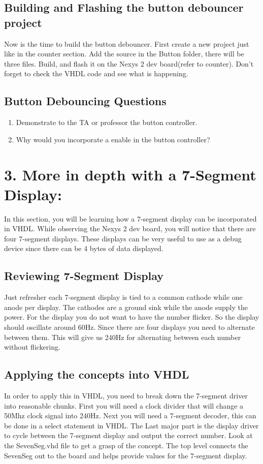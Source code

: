 \documentclass{article}
\begin{document}
\subsection{Building and Flashing the button debouncer project}
Now is the time to build the button debouncer. First create a new project just like in the counter section. Add the source in the Button folder, there will be three files. Build, and flash it on the Nexys 2 dev board(refer to counter). Don't forget to check the VHDL code and see what is happening.

\subsection{Button Debouncing Questions}

\begin{enumerate}
  \item Demonstrate to the TA or professor the button controller.
  \item Why would you incorporate a enable in the button controller?
\end{enumerate}

\newpage

\section{3. More in depth with a 7-Segment Display:}
In this section, you will be learning how a 7-segment display can be incorporated in VHDL. While observing the Nexys 2 dev board, you will notice that there are four 7-segment displays. These displays can be very useful to use as a debug device since there can be 4 bytes of data displayed.

\subsection{Reviewing 7-Segment Display}
Just refresher each 7-segment display is tied to a common cathode while one anode per display. The cathodes are a ground sink while the anode supply the power. For the display you do not want to have the number flicker. So the display should oscillate around 60Hz. Since there are four displays you need to alternate between them. This will give us 240Hz for alternating between each number without flickering.

\subsection{Applying the concepts into VHDL}
In order to apply this in VHDL, you need to break down the 7-segment driver into reasonable chunks. First you will need a clock divider that will change a 50Mhz clock signal into 240Hz. Next you will need a 7-segment decoder, this can be done in a select statement in VHDL. The Last major part is the display driver to cycle between the 7-segment display and output the correct number. Look at the SevenSeg.vhd file to get a grasp of the concept. The top level connects the SevenSeg out to the board and helps provide values for the 7-segment display.
\end{document}
